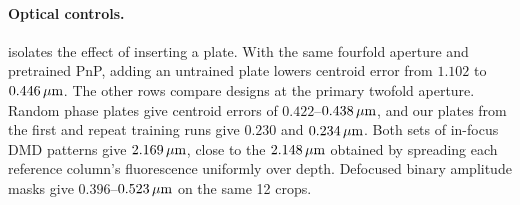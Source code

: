 \paragraph{Optical controls.}
 isolates the effect of inserting a plate. With the same fourfold aperture and pretrained PnP, adding an untrained plate lowers centroid error from $1.102$ to $0.446\,\mu\mathrm{m}$. The other rows compare designs at the primary twofold aperture. Random phase plates give centroid errors of $0.422$--$0.438\,\mu\mathrm{m}$, and our plates from the first and repeat training runs give $0.230$ and $0.234\,\mu\mathrm{m}$. Both sets of in-focus DMD patterns give $2.169\,\mu\mathrm{m}$, close to the $2.148\,\mu\mathrm{m}$ obtained by spreading each reference column's fluorescence uniformly over depth. Defocused binary amplitude masks give $0.396$--$0.523\,\mu\mathrm{m}$ on the same 12 crops.

\begin{table}[t]
\centering\footnotesize\setlength{\tabcolsep}{4pt}
\coltab{}
\caption{Optical controls on 12 reference-selected crops under pretrained PnP at $C=8$. For each untrained control, the numbered rows distinguish different random patterns or pattern sets. This comparison measures centroid error, PSNR and foreground SSIM. The bottom group isolates plate removal at the same $4\times$ aperture. All other rows use the $2\times$ aperture.}
\label{tab:s:untrained}
\end{table}
